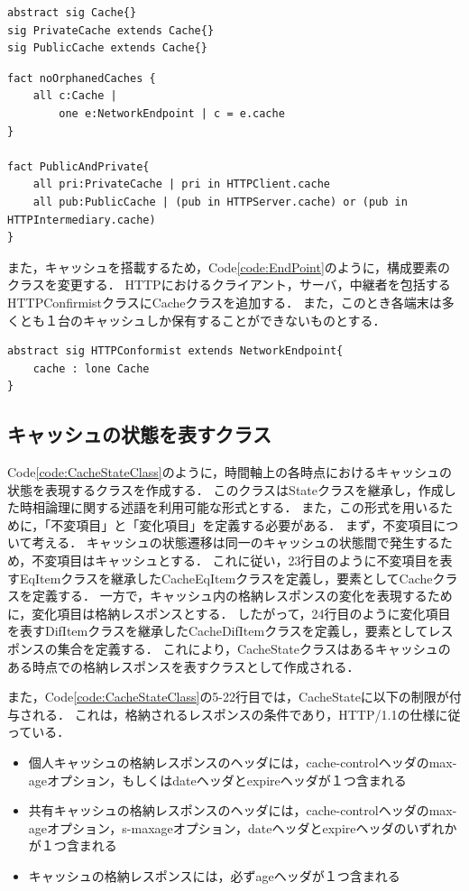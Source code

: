 \documentclass[12pt,a4paper]{jbook}
\begin{document}
\begin{lstlisting}[caption=Cacheクラス, label=code:CacheClass]
abstract sig Cache{}
sig PrivateCache extends Cache{}
sig PublicCache extends Cache{}
\end{lstlisting}

\begin{lstlisting}[caption=Cacheクラスの制限, label=code:LimitedCacheClass]
fact noOrphanedCaches {
	all c:Cache |
		one e:NetworkEndpoint | c = e.cache
}

fact PublicAndPrivate{
	all pri:PrivateCache | pri in HTTPClient.cache
	all pub:PublicCache | (pub in HTTPServer.cache) or (pub in HTTPIntermediary.cache)
}
\end{lstlisting}

また，キャッシュを搭載するため，Code\ref{code:EndPoint}のように，構成要素のクラスを変更する．
HTTPにおけるクライアント，サーバ，中継者を包括するHTTPConfirmistクラスにCacheクラスを追加する．
また，このとき各端末は多くとも１台のキャッシュしか保有することができないものとする．
\begin{lstlisting}[caption=HTTPを利用するウェブの構成要素, label=code:EndPoint]
abstract sig HTTPConformist extends NetworkEndpoint{
	cache : lone Cache
}
\end{lstlisting}

\subsection{キャッシュの状態を表すクラス}
\label{sec:CacheClass}
Code\ref{code:CacheStateClass}のように，時間軸上の各時点におけるキャッシュの状態を表現するクラスを作成する．
このクラスはStateクラスを継承し，作成した時相論理に関する述語を利用可能な形式とする．
また，この形式を用いるために，「不変項目」と「変化項目」を定義する必要がある．
まず，不変項目について考える．
キャッシュの状態遷移は同一のキャッシュの状態間で発生するため，不変項目はキャッシュとする．
これに従い，23行目のように不変項目を表すEqItemクラスを継承したCacheEqItemクラスを定義し，要素としてCacheクラスを定義する．
一方で，キャッシュ内の格納レスポンスの変化を表現するために，変化項目は格納レスポンスとする．
したがって，24行目のように変化項目を表すDifItemクラスを継承したCacheDifItemクラスを定義し，要素としてレスポンスの集合を定義する．
これにより，CacheStateクラスはあるキャッシュのある時点での格納レスポンスを表すクラスとして作成される．

また，Code\ref{code:CacheStateClass}の5-22行目では，CacheStateに以下の制限が付与される．
これは，格納されるレスポンスの条件であり，HTTP/1.1の仕様に従っている．
\begin{itemize}
\item 個人キャッシュの格納レスポンスのヘッダには，cache-controlヘッダのmax-ageオプション，もしくはdateヘッダとexpireヘッダが１つ含まれる
\item 共有キャッシュの格納レスポンスのヘッダには，cache-controlヘッダのmax-ageオプション，s-maxageオプション，dateヘッダとexpireヘッダのいずれかが１つ含まれる
\item キャッシュの格納レスポンスには，必ずageヘッダが１つ含まれる
\end{itemize}
\end{document}
